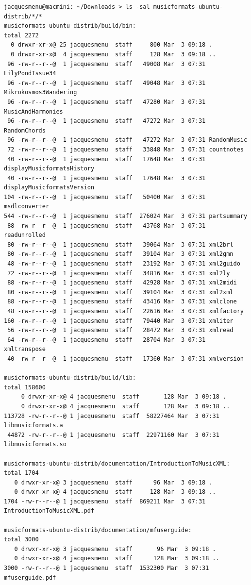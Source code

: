 \begin{lstlisting}[language=Terminal]
jacquesmenu@macmini: ~/Downloads > ls -sal musicformats-ubuntu-distrib/*/*
musicformats-ubuntu-distrib/build/bin:
total 2272
  0 drwxr-xr-x@ 25 jacquesmenu  staff     800 Mar  3 09:18 .
  0 drwxr-xr-x@  4 jacquesmenu  staff     128 Mar  3 09:18 ..
 96 -rw-r--r--@  1 jacquesmenu  staff   49008 Mar  3 07:31 LilyPondIssue34
 96 -rw-r--r--@  1 jacquesmenu  staff   49048 Mar  3 07:31 Mikrokosmos3Wandering
 96 -rw-r--r--@  1 jacquesmenu  staff   47280 Mar  3 07:31 MusicAndHarmonies
 96 -rw-r--r--@  1 jacquesmenu  staff   47272 Mar  3 07:31 RandomChords
 96 -rw-r--r--@  1 jacquesmenu  staff   47272 Mar  3 07:31 RandomMusic
 72 -rw-r--r--@  1 jacquesmenu  staff   33848 Mar  3 07:31 countnotes
 40 -rw-r--r--@  1 jacquesmenu  staff   17648 Mar  3 07:31 displayMusicformatsHistory
 40 -rw-r--r--@  1 jacquesmenu  staff   17648 Mar  3 07:31 displayMusicformatsVersion
104 -rw-r--r--@  1 jacquesmenu  staff   50400 Mar  3 07:31 msdlconverter
544 -rw-r--r--@  1 jacquesmenu  staff  276024 Mar  3 07:31 partsummary
 88 -rw-r--r--@  1 jacquesmenu  staff   43768 Mar  3 07:31 readunrolled
 80 -rw-r--r--@  1 jacquesmenu  staff   39064 Mar  3 07:31 xml2brl
 80 -rw-r--r--@  1 jacquesmenu  staff   39104 Mar  3 07:31 xml2gmn
 48 -rw-r--r--@  1 jacquesmenu  staff   23192 Mar  3 07:31 xml2guido
 72 -rw-r--r--@  1 jacquesmenu  staff   34816 Mar  3 07:31 xml2ly
 88 -rw-r--r--@  1 jacquesmenu  staff   42928 Mar  3 07:31 xml2midi
 80 -rw-r--r--@  1 jacquesmenu  staff   39104 Mar  3 07:31 xml2xml
 88 -rw-r--r--@  1 jacquesmenu  staff   43416 Mar  3 07:31 xmlclone
 48 -rw-r--r--@  1 jacquesmenu  staff   22616 Mar  3 07:31 xmlfactory
160 -rw-r--r--@  1 jacquesmenu  staff   79440 Mar  3 07:31 xmliter
 56 -rw-r--r--@  1 jacquesmenu  staff   28472 Mar  3 07:31 xmlread
 64 -rw-r--r--@  1 jacquesmenu  staff   28704 Mar  3 07:31 xmltranspose
 40 -rw-r--r--@  1 jacquesmenu  staff   17360 Mar  3 07:31 xmlversion

musicformats-ubuntu-distrib/build/lib:
total 158600
     0 drwxr-xr-x@ 4 jacquesmenu  staff       128 Mar  3 09:18 .
     0 drwxr-xr-x@ 4 jacquesmenu  staff       128 Mar  3 09:18 ..
113728 -rw-r--r--@ 1 jacquesmenu  staff  58227464 Mar  3 07:31 libmusicformats.a
 44872 -rw-r--r--@ 1 jacquesmenu  staff  22971160 Mar  3 07:31 libmusicformats.so

musicformats-ubuntu-distrib/documentation/IntroductionToMusicXML:
total 1704
   0 drwxr-xr-x@ 3 jacquesmenu  staff      96 Mar  3 09:18 .
   0 drwxr-xr-x@ 4 jacquesmenu  staff     128 Mar  3 09:18 ..
1704 -rw-r--r--@ 1 jacquesmenu  staff  869211 Mar  3 07:31 IntroductionToMusicXML.pdf

musicformats-ubuntu-distrib/documentation/mfuserguide:
total 3000
   0 drwxr-xr-x@ 3 jacquesmenu  staff       96 Mar  3 09:18 .
   0 drwxr-xr-x@ 4 jacquesmenu  staff      128 Mar  3 09:18 ..
3000 -rw-r--r--@ 1 jacquesmenu  staff  1532300 Mar  3 07:31 mfuserguide.pdf
\end{lstlisting}

